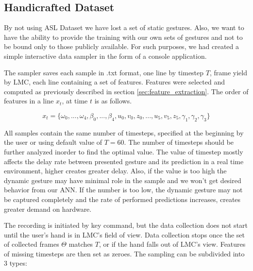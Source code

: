 \subsection{Handicrafted Dataset}
\label{handicrafted_dataset}
By not using ASL Dataset we have lost a set of static gestures. Also, we want to have the ability to provide the training with our own sets of gestures and not to be bound only to those publicly available. For such purposes, we had created a simple interactive data sampler in the form of a console application.

The sampler saves each sample in .txt format, one line by timestep $T$, frame yield by LMC, each line containing a set of features. Features were selected and computed as previously described in section \ref{sec:feature_extraction}. The order of features in a line $x_t$, at time $t$ is as follows.


\begin{equation}
	{x_t = \{\omega_0, ...,\omega_4, \beta_0, ..., \beta_4, u_0,v_0,z_0, ..., u_5,v_5,z_5, \gamma_1, \gamma_2, \gamma_3\}}
\end{equation}

All samples contain the same number of timesteps, specified at the beginning by the user or using default value of $T=60$. The number of timesteps should be further analyzed inorder to find the optimal value. The value of timestep mostly affects the delay rate between presented gesture and its prediction in a real time environment, higher creates greater delay. Also, if the value is too high the dynamic gesture may have minimal role in the sample and we won't get desired behavior from our ANN. If the number is too low, the dynamic gesture may not be captured completely and the rate of performed predictions increases, creates greater demand on hardware. 

The recording is initiated by key command, but the data collection does not start until the user's hand is in LMC's field of view. Data collection stops once the set of collected frames $\Theta$ matches $T$, or if the hand falls out of LMC's view. Features of missing timesteps are then set as zeroes. The sampling can be subdivided into 3 types:

